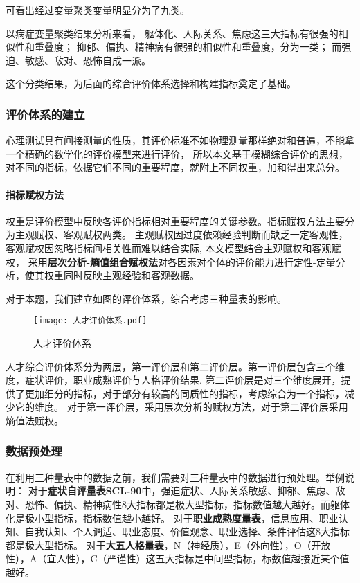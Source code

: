 \documentclass[withoutpreface,bwprint]{cumcmthesis} %
\begin{document}
可看出经过变量聚类变量明显分为了九类。

以病症变量聚类结果分析来看，
躯体化、人际关系、焦虑这三大指标有很强的相似性和重叠度；
抑郁、偏执、精神病有很强的相似性和重叠度，分为一类；
而强迫、敏感、敌对、恐怖自成一派。

这个分类结果，为后面的综合评价体系选择和构建指标奠定了基础。


\subsubsection{评价体系的建立}


心理测试具有间接测量的性质，其评价标准不如物理测量那样绝对和普遍，不能拿一个精确的数学化的评价模型来进行评价，
所以本文基于模糊综合评价的思想，对不同的指标，依据它们不同的重要程度，就附上不同权重，加和得出来总分。

\paragraph*{指标赋权方法}权重是评价模型中反映各评价指标相对重要程度的关键参数。指标赋权方法主要分为主观赋权、客观赋权两类。
主观赋权因过度依赖经验判断而缺乏一定客观性，客观赋权因忽略指标间相关性而难以结合实际, 本文模型结合主观赋权和客观赋权，
采用\textbf{层次分析-熵值组合赋权法}对各因素对个体的评价能力进行定性-定量分析，使其权重同时反映主观经验和客观数据。

对于本题，我们建立如图的评价体系，综合考虑三种量表的影响。

\begin{figure}[!h]
    \centering
    \texttt{[image: 人才评价体系.pdf]}
    \caption{人才评价体系}
    \label{fig:judgement}
\end{figure}

人才综合评价体系分为两层，第一评价层和第二评价层。第一评价层包含三个维度，症状评价，职业成熟评价与人格评价结果.
第二评价层是对三个维度展开，提供了更加细分的指标，对于部分有较高的同质性的指标，考虑综合为一个指标，减少它的维度。
对于第一评价层，采用层次分析的赋权方法，对于第二评价层采用熵值法赋权。


\subsubsection{数据预处理}
在利用三种量表中的数据之前，我们需要对三种量表中的数据进行预处理。举例说明：
对于\textbf{症状自评量表SCL-90}中，强迫症状、人际关系敏感、抑郁、焦虑、敌对、恐怖、偏执、精神病性8大指标都是极大型指标，指标数值越大越好。而躯体化是极小型指标，指标数值越小越好。
对于\textbf{职业成熟度量表}，信息应用、职业认知、自我认知、个人调适、职业态度、价值观念、职业选择、条件评估这8大指标都是极大型指标。
对于\textbf{大五人格量表}，N（神经质），E（外向性），O（开放性），A（宜人性），C（严谨性）这五大指标是中间型指标，标数值越接近某个值越好。
\end{document}
